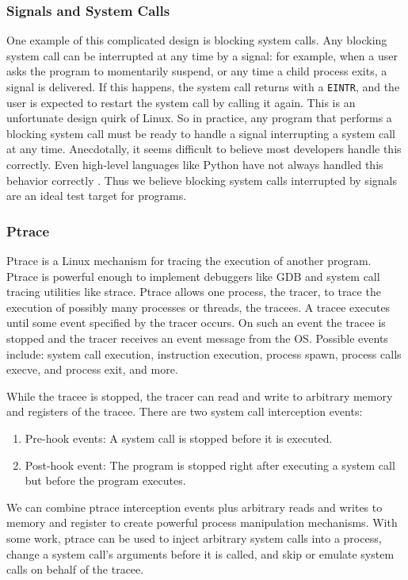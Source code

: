 \subsubsection{Signals and System Calls}
\label{blockingandsignals}
One example of this complicated design is blocking system calls. Any blocking system call can be interrupted at any time by a signal: for example, when a user asks the program to momentarily suspend, or any time a child process exits, a signal is delivered. If this happens, the system call returns with a \texttt{EINTR}, and the user is expected to restart the system call by calling it again. This is an unfortunate design quirk of Linux. So in practice, any program that performs a blocking system call must be ready to handle a signal interrupting a system call at any time. Anecdotally, it seems difficult to believe most developers handle this correctly. Even high-level languages like Python have not always handled this behavior correctly \cite{pep}. Thus we believe blocking system calls interrupted by signals are an ideal test target for programs.

\subsubsection{Ptrace} \label{sec:ptrace-summary}
Ptrace is a Linux mechanism for tracing the execution of another program. Ptrace     is powerful enough to implement debuggers like GDB and system call tracing utilities     like strace. Ptrace allows one process, the tracer, to trace the execution of possibly     many processes or threads, the tracees. A tracee executes until some event specified by the tracer occurs. On such an event the tracee is stopped and the tracer receives an event message from the OS. Possible events include: system call execution, instruction execution, process spawn, process calls execve, and process exit, and more.

While the tracee is stopped, the tracer can read and write to arbitrary memory and registers of the tracee. There are two system call interception events:
\begin{enumerate}
     \item Pre-hook events: A system call is stopped before it is executed.
     \item Post-hook event: The program is stopped right after executing a system call but before the program executes.
\end{enumerate}
     We can combine ptrace interception events plus arbitrary reads and writes to memory and register to create powerful process manipulation mechanisms. With some work, ptrace can be used to inject arbitrary system calls into a process, change a system call's arguments before it is called, and skip or emulate system calls on behalf of the tracee.
